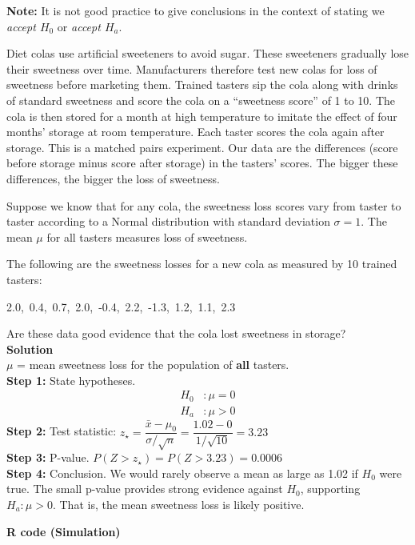 \textbf{Note:} It is not good practice to give conclusions in the context of stating we \textit{accept $H_0$} or \textit{accept $H_a$}.
\begin{example}
Diet colas use artificial sweeteners to avoid sugar. These sweeteners gradually lose their sweetness over time. Manufacturers therefore test new colas for loss of sweetness before marketing them. Trained tasters sip the cola along with drinks of standard sweetness and score the cola on a “sweetness score” of 1 to 10. The cola is then stored for a month at high temperature to imitate the effect of four months’ storage at room temperature. Each taster scores the cola again after storage. This is a matched pairs experiment. Our data are the differences (score before storage minus score after storage) in the tasters’ scores. The bigger these differences, the bigger the loss of sweetness.

Suppose we know that for any cola, the sweetness loss scores vary from taster to taster according to a Normal distribution with standard deviation $\sigma = 1$. The mean $\mu$ for all tasters measures loss of sweetness.

The following are the sweetness losses for a new cola as measured by 10 trained tasters:

\medskip
\centerline{2.0,\ 0.4,\ 0.7,\ 2.0,\ -0.4,\ 2.2,\ -1.3,\ 1.2,\ 1.1,\ 2.3}
\medskip

Are these data good evidence that the cola lost sweetness in storage?\\
\noindent\textbf{Solution}\\

$\mu$ = mean sweetness loss for the population of \textbf{all} tasters.\\
\textbf{Step 1:} State hypotheses.
\begin{align*}
H_0 &: \mu = 0 \\
H_a &: \mu > 0
\end{align*}
\textbf{Step 2:} Test statistic: $z_\star = \dfrac{\bar{x} - \mu_0}{\sigma / \sqrt{n}} = \dfrac{1.02 - 0}{1 / \sqrt{10}} = 3.23$ \\
\textbf{Step 3:} P-value. $P(Z > z_\star) = P(Z > 3.23) = 0.0006$ \\
\textbf{Step 4:} Conclusion. We would rarely observe a mean as large as 1.02 if $H_0$ were true. The small p-value provides strong evidence against $H_0$, supporting $H_a: \mu > 0$. That is, the mean sweetness loss is likely positive.

\vspace{1em}
\noindent\textbf{R code (Simulation)}


\end{example}
